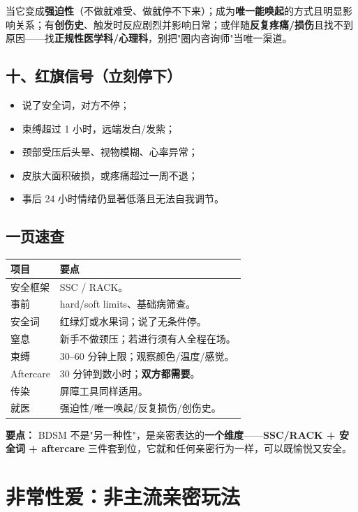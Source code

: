 \documentclass[12pt,UTF8,openany]{ctexbook}
\begin{document}
当它变成\textbf{强迫性}（不做就难受、做就停不下来）；成为\textbf{唯一能唤起}的方式且明显影响关系；有\textbf{创伤史}、触发时反应剧烈并影响日常；或伴随\textbf{反复疼痛/损伤}且找不到原因——找\textbf{正规性医学科/心理科}，别把"圈内咨询师"当唯一渠道。

\section{十、红旗信号（立刻停下）}

\begin{itemize}
  \item 说了安全词，对方不停；
  \item 束缚超过 1 小时，远端发白/发紫；
  \item 颈部受压后头晕、视物模糊、心率异常；
  \item 皮肤大面积破损，或疼痛超过一周不退；
  \item 事后 24 小时情绪仍显著低落且无法自我调节。
\end{itemize}

\section{一页速查}

\begin{tabularx}{\textwidth}{lX}
\toprule
\textbf{项目} & \textbf{要点} \\
\midrule
安全框架 & SSC / RACK。 \\
事前 & hard/soft limits、基础病筛查。 \\
安全词 & 红绿灯或水果词；说了无条件停。 \\
窒息 & 新手不做颈压；若进行须有人全程在场。 \\
束缚 & 30--60 分钟上限；观察颜色/温度/感觉。 \\
Aftercare & 30 分钟到数小时；\textbf{双方都需要}。 \\
传染 & 屏障工具同样适用。 \\
就医 & 强迫性/唯一唤起/反复损伤/创伤史。 \\
\bottomrule
\end{tabularx}

\vspace{1em}
\noindent\textbf{要点：} BDSM 不是"另一种性"，是亲密表达的\textbf{一个维度}——\textbf{SSC/RACK + 安全词 + aftercare} 三件套到位，它就和任何亲密行为一样，可以既愉悦又安全。

\chapter{非常性爱：非主流亲密玩法}
\end{document}
